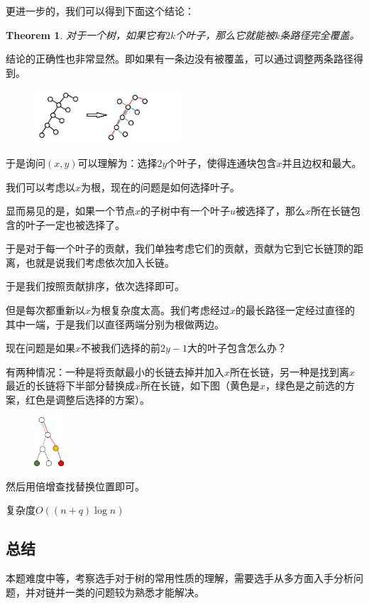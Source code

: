\documentclass[12pt]{article}
\newtheorem{theorem}{Theorem}
\begin{document}
更进一步的，我们可以得到下面这个结论：

\begin{theorem}
  对于一个树，如果它有$2k$个叶子，那么它就能被$k$条路径完全覆盖。
\end{theorem}

结论的正确性也非常显然。即如果有一条边没有被覆盖，可以通过调整两条路径得到。
\begin{figure}[h]
  \centering
  \includegraphics[width=0.5\textwidth]{p2.png}
  \label{p2}
\end{figure}

于是询问$(x,y)$可以理解为：选择$2y$个叶子，使得连通块包含$x$并且边权和最大。

我们可以考虑以$x$为根，现在的问题是如何选择叶子。

显而易见的是，如果一个节点$x$的子树中有一个叶子$u$被选择了，那么$x$所在长链包含的叶子一定也被选择了。

于是对于每一个叶子的贡献，我们单独考虑它们的贡献，贡献为它到它长链顶的距离，也就是说我们考虑依次加入长链。

于是我们按照贡献排序，依次选择即可。

但是每次都重新以$x$为根复杂度太高。我们考虑经过$x$的最长路径一定经过直径的其中一端，于是我们以直径两端分别为根做两边。

现在问题是如果$x$不被我们选择的前$2y-1$大的叶子包含怎么办？

有两种情况：一种是将贡献最小的长链去掉并加入$x$所在长链，另一种是找到离$x$最近的长链将下半部分替换成$x$所在长链，如下图（黄色是$x$，绿色是之前选的方案，红色是调整后选择的方案）。

\begin{figure}[h]
  \centering
  \includegraphics[width=0.1\textwidth]{p7.png}
  \label{p3}
\end{figure}

然后用倍增查找替换位置即可。

复杂度$O((n+q)\log n)$

\subsection{总结}
本题难度中等，考察选手对于树的常用性质的理解，需要选手从多方面入手分析问题，并对链并一类的问题较为熟悉才能解决。
\end{document}
